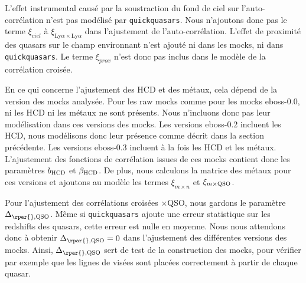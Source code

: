 L'effet instrumental causé par la soustraction du fond de ciel sur l'auto-corrélation n'est pas modélisé par \texttt{quickquasars}. Nous n'ajoutons donc pas le terme $\xi_{ciel}$ à $\xi_{\mathrm{Ly}\alpha\times\mathrm{Ly}\alpha}$ dans l'ajustement de l'auto-corrélation.
L'effet de proximité des quasars sur le champ \lya{} environnant n'est ajouté ni dans les mocks, ni dans \texttt{quickquasars}. Le terme
$\xi_{prox}$ n'est donc pas inclus dans le modèle de la corrélation croisée.

En ce qui concerne l'ajustement des HCD et des métaux, cela dépend de la version des mocks analysée.
Pour les raw mocks comme pour les mocks eboss-0.0, ni les HCD ni les métaux ne sont présents. Nous n'incluons donc pas leur modélisation dans ces versions des mocks.
Les versions eboss-0.2 incluent les HCD, nous modélisons donc leur présence comme décrit dans la section précédente.
Les versions eboss-0.3 incluent à la fois les HCD et les métaux. L'ajustement des fonctions de corrélation issues de ces mocks contient donc les paramètres $b_{\textsc{HCD}}$ et $\beta_{\textsc{HCD}}$. De plus, nous calculons la matrice des métaux pour ces versions et ajoutons au modèle les termes $\xi_{m\times n}$ et $\xi_{m\times \textsc{QSO}}$.

Pour l'ajustement des corrélations croisées \lya{}$\times$QSO, nous gardons le paramètre $\Delta_{\rpar{}, \textsc{QSO}}$. Même si \texttt{quickquasars} ajoute une erreur statistique sur les redshifts des quasars, cette erreur est nulle en moyenne. Nous nous attendons donc à obtenir $\Delta_{\rpar{}, \textsc{QSO}} = 0$ dans l'ajustement des différentes versions des mocks. Ainsi, $\Delta_{\rpar{}, \textsc{QSO}}$ sert de test de la construction des mocks, pour vérifier par exemple que les lignes de visées sont placées correctement à partir de chaque quasar.

